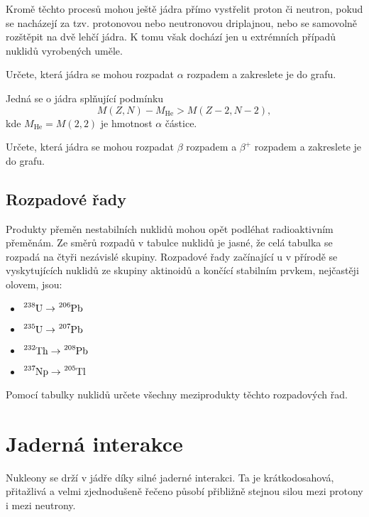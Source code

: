 \documentclass[a4paper,12pt,oneside]{article}
\theoremstyle{red}
\begin{document}
    Kromě těchto procesů mohou ještě jádra přímo vystřelit proton či neutron, pokud se nacházejí za tzv. protonovou nebo neutronovou driplajnou, nebo se samovolně rozštěpit na dvě lehčí jádra.
    K tomu však dochází jen u extrémních případů nuklidů vyrobených uměle.

    \begin{task}
        Určete, která jádra se mohou rozpadat $\alpha$ rozpadem a zakreslete je do grafu.
    \end{task}
    Jedná se o jádra splňující podmínku
    \begin{equation}
        M(Z, N)-M_{\mathrm{He}}>M(Z-2,N-2),
    \end{equation}
    kde $M_{\mathrm{He}}=M(2,2)$ je hmotnost $\alpha$ částice.

    \begin{task}
        Určete, která jádra se mohou rozpadat $\beta$ rozpadem a $\beta^{+}$ rozpadem a zakreslete je do grafu.
    \end{task}
    
\subsection{Rozpadové řady}
    Produkty přeměn nestabilních nuklidů mohou opět podléhat radioaktivním přeměnám.
    Ze směrů rozpadů v tabulce nuklidů je jasné, že celá tabulka se rozpadá na čtyři nezávislé skupiny.
    Rozpadové řady začínající u v přírodě se vyskytujících nuklidů ze skupiny aktinoidů a končící stabilním prvkem, nejčastěji olovem, jsou:
    \begin{itemize}
        \item $\ce{^{238}U}\rightarrow\ce{^{206}Pb}$
        \item $\ce{^{235}U}\rightarrow\ce{^{207}Pb}$
        \item $\ce{^{232}Th}\rightarrow\ce{^{208}Pb}$
        \item $\ce{^{237}Np}\rightarrow\ce{^{205}Tl}$
    \end{itemize}
    \begin{task}
        Pomocí tabulky nuklidů určete všechny meziprodukty těchto rozpadových řad.
    \end{task}

\section{Jaderná interakce}
    Nukleony se drží v jádře díky silné jaderné interakci. 
    Ta je krátkodosahová, přitažlivá a velmi zjednodušeně řečeno působí přibližně stejnou silou mezi protony i mezi neutrony.
    
\end{document}

